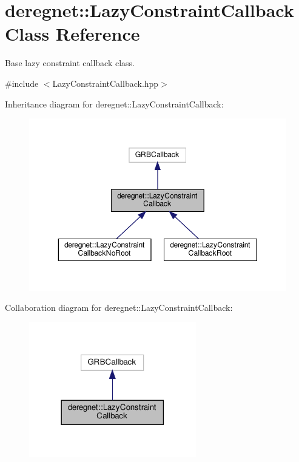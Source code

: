 \hypertarget{classderegnet_1_1LazyConstraintCallback}{}\section{deregnet\+:\+:Lazy\+Constraint\+Callback Class Reference}
\label{classderegnet_1_1LazyConstraintCallback}


Base lazy constraint callback class.  




{\ttfamily \#include $<$Lazy\+Constraint\+Callback.\+hpp$>$}



Inheritance diagram for deregnet\+:\+:Lazy\+Constraint\+Callback\+:\nopagebreak
\begin{figure}[H]
\begin{center}
\leavevmode
\includegraphics[width=350pt]{classderegnet_1_1LazyConstraintCallback__inherit__graph}
\end{center}
\end{figure}


Collaboration diagram for deregnet\+:\+:Lazy\+Constraint\+Callback\+:\nopagebreak
\begin{figure}[H]
\begin{center}
\leavevmode
\includegraphics[width=206pt]{classderegnet_1_1LazyConstraintCallback__coll__graph}
\end{center}
\end{figure}
